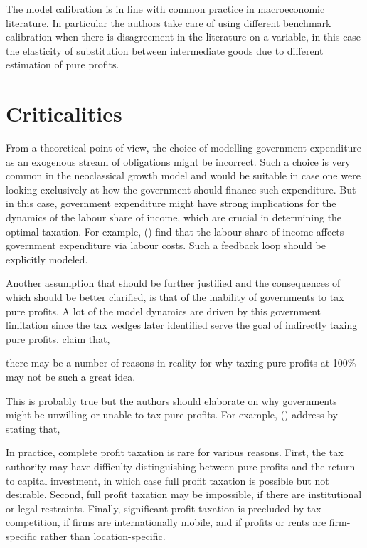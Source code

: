 \documentclass[american]{scrartcl}
\newcommand{\citein}[1]{\citeauthor{#1} (\citeyear{#1})}
\begin{document}
The model calibration is in line with common practice in macroeconomic literature. In particular the authors take care of using different benchmark calibration when there is disagreement in the literature on a variable, in this case the elasticity of substitution between intermediate goods due to different estimation of pure profits.

\section{Criticalities}

From a theoretical point of view, the choice of modelling government expenditure as an exogenous stream of obligations might be incorrect. Such a choice is very common in the neoclassical growth model and would be suitable in case one were looking exclusively at how the government should finance such expenditure. But in this case, government expenditure might have strong implications for the dynamics of the labour share of income, which are crucial in determining the optimal taxation. For example, \citein{Facchini2016} find that the labour share of income affects government expenditure via labour costs. Such a feedback loop should be explicitly modeled.

Another assumption that should be further justified and the consequences of which should be better clarified, is that of the inability of governments to tax pure profits. A lot of the model dynamics are driven by this government limitation since the tax wedges later identified serve the goal of indirectly taxing pure profits. \citeauthor{Atesagaoglu2020} claim that,

\begin{displayquote}[p. 12]
    there may be a number of reasons in reality for why taxing pure profits at 100\% may not be such a great idea.
\end{displayquote}

This is probably true but the authors should elaborate on why governments might be unwilling or unable to tax pure profits. For example, \citein{Huizinga1997} address by stating that,

\begin{displayquote}[p. 156]
    In practice, complete profit taxation is rare for various reasons. First, the tax authority may have difficulty distinguishing between pure profits and the return to capital investment, in which case full profit taxation is possible but not desirable. Second, full profit taxation may be impossible, if there are institutional or legal restraints. Finally, significant profit taxation is precluded by tax competition, if firms are internationally mobile, and if profits or rents are firm-specific rather than location-specific.
\end{displayquote}
\end{document}
